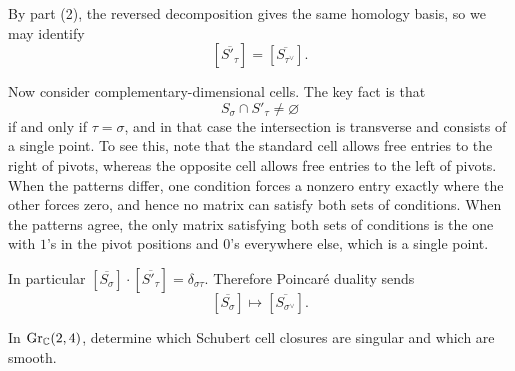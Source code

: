 \documentclass[12pt]{article}  %
\begin{document}
\begin{solution}
\begin{enumerate}
By part (2), the reversed decomposition gives the same homology basis, so we may identify
\[
[\overline{S'_\tau}]=[\overline{S_{\tau^\vee}}].
\]

Now consider complementary-dimensional cells. The key fact is that
\[
S_\sigma\cap S'_\tau\neq \varnothing
\]
if and only if $\tau=\sigma$, and in that case the intersection is transverse and consists of a single point. To see this, note that the standard cell allows free entries to the right of pivots, whereas the opposite cell allows free entries to the left of pivots. When the patterns differ, one condition forces a nonzero entry exactly where the other forces zero, and hence no matrix can satisfy both sets of conditions. When the patterns agree, the only matrix satisfying both sets of conditions is the one with $1$'s in the pivot positions and $0$'s everywhere else, which is a single point. 


In particular $[\overline{S_\sigma}] \cdot [\overline{S'_\tau}]
=
\delta_{\sigma\tau}$.
Therefore Poincar\'e duality sends
\[
[\overline{S_\sigma}]
\longmapsto
[\overline{S_{\sigma^\vee}}].
\]

\end{enumerate}
\end{solution}

\begin{problem}[2]
In $\operatorname{Gr}_{\mathbb{C}}(2,4)$, determine which Schubert cell closures are singular and which are smooth.
\end{problem}
\end{document}
